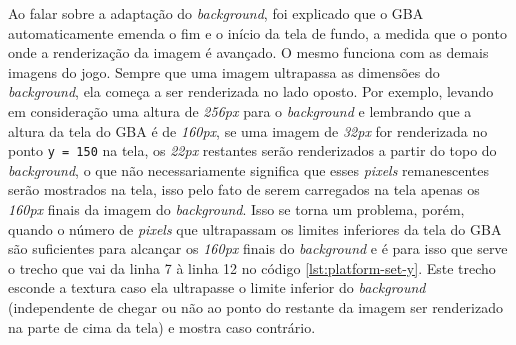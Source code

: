 Ao falar sobre a adaptação do \textit{background}, foi explicado que o GBA automaticamente emenda o fim e o início da tela de fundo, a medida que o ponto onde a renderização da imagem é avançado. O mesmo funciona com as demais imagens do jogo. Sempre que uma imagem ultrapassa as dimensões do \textit{background}, ela começa a ser renderizada no lado oposto. Por exemplo, levando em consideração uma altura de \textit{256px} para o \textit{background} e lembrando que a altura da tela do GBA é de \textit{160px}, se uma imagem de \textit{32px} for renderizada no ponto \texttt{y = 150} na tela, os \textit{22px} restantes serão renderizados a partir do topo do \textit{background}, o que não necessariamente significa que esses \textit{pixels} remanescentes serão mostrados na tela, isso pelo fato de serem carregados na tela apenas os \textit{160px} finais da imagem do \textit{background}. Isso se torna um problema, porém, quando o número de \textit{pixels} que ultrapassam os limites inferiores da tela do GBA são suficientes para alcançar os \textit{160px} finais do \textit{background} e é para isso que serve o trecho que vai da linha 7 à linha 12 no código \ref{lst:platform-set-y}. Este trecho esconde a textura caso ela ultrapasse o limite inferior do \textit{background} (independente de chegar ou não ao ponto do restante da imagem ser renderizado na parte de cima da tela) e mostra caso contrário.
